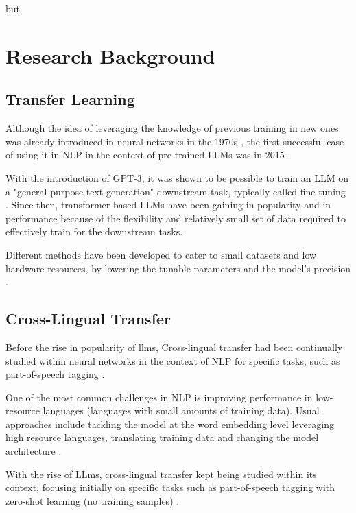 but\section{Research Background}\label{section::research_background}

\subsection{Transfer Learning}

Although the idea of leveraging the knowledge of previous training in new ones was already introduced in neural networks in the 1970s \cite{bozinovski2020reminder}, the first successful case of using it in NLP in the context of pre-trained LLMs was in 2015 \cite{HAN2021225}.

With the introduction of GPT-3, it was shown to be possible to train an LLM on a "general-purpose text generation" downstream task, typically called fine-tuning \cite{WANG202351}. Since then, transformer-based LLMs have been gaining in popularity and in performance because of the flexibility and relatively small set of data required to effectively train for the downstream tasks.

Different methods have been developed to cater to small datasets and low hardware resources, by lowering the tunable parameters and the model's precision \cite{parthasarathy2024ultimate}.
\subsection{Cross-Lingual Transfer}


Before the rise in popularity of llms, Cross-lingual transfer had been continually studied within neural networks in the context of NLP for specific tasks, such as part-of-speech tagging \cite{kim-etal-2017-cross}.

One of the most common challenges in NLP is improving performance in low-resource languages (languages with small amounts of training data). Usual approaches include tackling the model at the word embedding level leveraging high resource languages, translating training data \cite{schuster2018cross} and changing the model architecture \cite{pfeiffer2020mad}.

With the rise of LLms, cross-lingual transfer kept being studied within its context, focusing initially on specific tasks such as part-of-speech tagging with zero-shot learning (no training samples) \cite{adelani2024comparing}.

